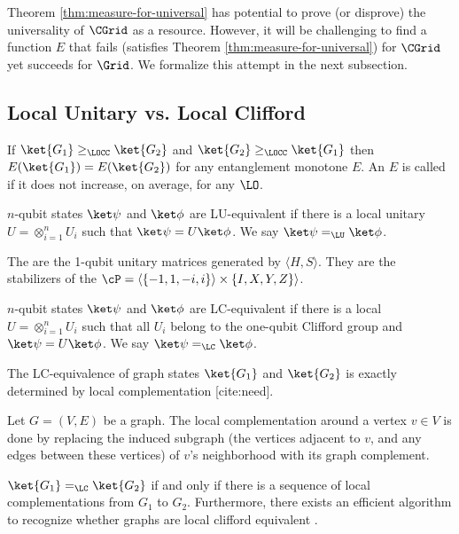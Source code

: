 Theorem \ref{thm:measure-for-universal} has potential to prove (or disprove) the universality of $\CGrid$ as a resource. However, it will be challenging to find a function $E$ that fails (satisfies Theorem \ref{thm:measure-for-universal}) for $\CGrid$ yet succeeds for $\Grid$. We formalize this attempt in the next subsection.

\subsection{Local Unitary vs. Local Clifford}

\begin{definition}
If $\ket{G_1} \geq_\LOCC \ket{G_2}$ and $\ket{G_2} \geq_\LOCC \ket{G_1}$ then $E(\ket{G_1}) = E(\ket{G_2})$ for any entanglement monotone $E$. An $E$ is called  if it does not increase, on average, for any $\LO$.
\end{definition}

\begin{definition}
$n$-qubit states $\ket\psi$ and $\ket\phi$ are LU-equivalent if there is a local unitary $U = \otimes_{i=1}^n U_i$ such that $\ket\psi = U \ket\phi$. We say $\ket\psi =_\LU \ket\phi$.
\end{definition}

\begin{definition}
The  are the 1-qubit unitary matrices generated by $\langle H, S \rangle$. They are the stabilizers of the  $\cP = \langle \{-1,1,-i,i\} \rangle \times \{I,X,Y,Z\} \rangle$.
\end{definition}

\begin{definition}
$n$-qubit states $\ket\psi$ and $\ket\phi$ are LC-equivalent if there is a local  $U = \otimes_{i=1}^n U_i$ such that all $U_i$ belong to the one-qubit Clifford group and $\ket\psi = U \ket\phi$. We say $\ket\psi =_\LC \ket\phi$.
\end{definition}

\begin{theorem}
The LC-equivalence of graph states $\ket{G_1}$ and $\ket{G_2}$ is exactly determined by local complementation [cite:need]. 
\end{theorem}

\begin{definition}
Let $G = (V,E)$ be a graph. The local complementation around a vertex $v \in V$ is done by replacing the induced subgraph (the vertices adjacent to $v$, and any edges between these vertices) of $v$'s neighborhood with its graph complement.
\end{definition}

\begin{theorem}
$\ket{G_1} =_\LC \ket{G_2}$ if and only if there is a sequence of local complementations from $G_1$ to $G_2$. Furthermore, there exists an efficient algorithm to recognize whether graphs are local clifford equivalent \cite{lc-equiv-alg}.
\end{theorem}